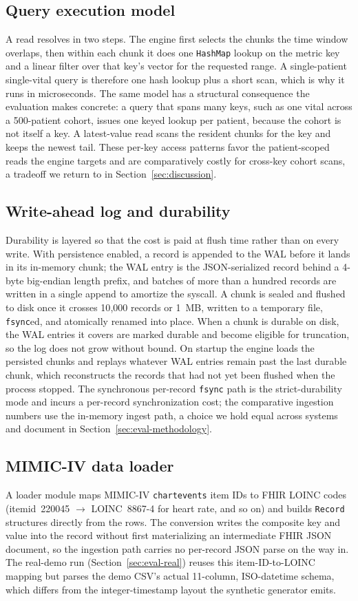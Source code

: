 \documentclass[journal]{IEEEtran}
\begin{document}
\subsection{Query execution model}
A read resolves in two steps. The engine first selects the chunks the time window overlaps, then within each chunk it does one \texttt{HashMap} lookup on the metric key and a linear filter over that key's vector for the requested range. A single-patient single-vital query is therefore one hash lookup plus a short scan, which is why it runs in microseconds. The same model has a structural consequence the evaluation makes concrete: a query that spans many keys, such as one vital across a 500-patient cohort, issues one keyed lookup per patient, because the cohort is not itself a key. A latest-value read scans the resident chunks for the key and keeps the newest tail. These per-key access patterns favor the patient-scoped reads the engine targets and are comparatively costly for cross-key cohort scans, a tradeoff we return to in Section~\ref{sec:discussion}.

\subsection{Write-ahead log and durability}
Durability is layered so that the cost is paid at flush time rather than on every write. With persistence enabled, a record is appended to the WAL before it lands in its in-memory chunk; the WAL entry is the JSON-serialized record behind a 4-byte big-endian length prefix, and batches of more than a hundred records are written in a single append to amortize the syscall. A chunk is sealed and flushed to disk once it crosses 10{,}000 records or 1~MB, written to a temporary file, \texttt{fsync}ed, and atomically renamed into place. When a chunk is durable on disk, the WAL entries it covers are marked durable and become eligible for truncation, so the log does not grow without bound. On startup the engine loads the persisted chunks and replays whatever WAL entries remain past the last durable chunk, which reconstructs the records that had not yet been flushed when the process stopped. The synchronous per-record \texttt{fsync} path is the strict-durability mode and incurs a per-record synchronization cost; the comparative ingestion numbers use the in-memory ingest path, a choice we hold equal across systems and document in Section~\ref{sec:eval-methodology}.

\subsection{MIMIC-IV data loader}
A loader module maps MIMIC-IV \texttt{chartevents} item IDs to FHIR LOINC codes (itemid~220045 $\rightarrow$ LOINC~8867-4 for heart rate, and so on) and builds \texttt{Record} structures directly from the rows. The conversion writes the composite key and value into the record without first materializing an intermediate FHIR JSON document, so the ingestion path carries no per-record JSON parse on the way in. The real-demo run (Section~\ref{sec:eval-real}) reuses this item-ID-to-LOINC mapping but parses the demo CSV's actual 11-column, ISO-datetime schema, which differs from the integer-timestamp layout the synthetic generator emits.
\end{document}
